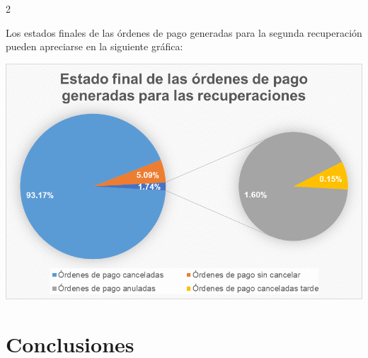 \documentclass[12pt,spanish,Letterpaper,openany]{book}
\newcommand{\spacethreemilis}{\vspace{3mm}}
\begin{document}
\begin {multicols}{2}
\begin {flushleft}
\begin{minipage}[c]{\columnwidth}
\end{minipage}

\end {flushleft}

\spacethreemilis

Los estados finales de las órdenes de pago generadas para la segunda recuperación pueden apreciarse en la siguiente gráfica:

\begin {flushleft}
\noindent\begin{minipage}[c]{\columnwidth}

\includegraphics[width=1\linewidth]{images/image07_rherrera}

\end{minipage}

\end {flushleft}

\hypertarget{conclusiones-2}{%
\section{Conclusiones}\label{conclusiones-2}}


\end{multicols}
\end{document}

